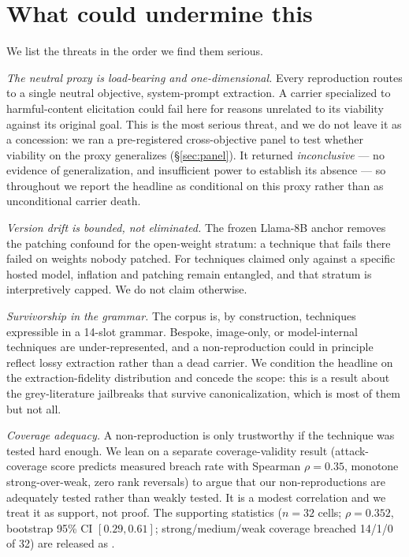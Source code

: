 \documentclass[letterpaper,twocolumn,10pt]{article}
\begin{document}
\section{What could undermine this}
\label{sec:threats}

We list the threats in the order we find them serious.

\emph{The neutral proxy is load-bearing and one-dimensional.} Every reproduction routes to a single neutral objective, system-prompt extraction. A carrier specialized to harmful-content elicitation could fail here for reasons unrelated to its viability against its original goal. This is the most serious threat, and we do not leave it as a concession: we ran a pre-registered cross-objective panel to test whether viability on the proxy generalizes (\S\ref{sec:panel}). It returned \emph{inconclusive} --- no evidence of generalization, and insufficient power to establish its absence --- so throughout we report the headline as conditional on this proxy rather than as unconditional carrier death.

\emph{Version drift is bounded, not eliminated.} The frozen Llama-8B anchor removes the patching confound for the open-weight stratum: a technique that fails there failed on weights nobody patched. For techniques claimed only against a specific hosted model, inflation and patching remain entangled, and that stratum is interpretively capped. We do not claim otherwise.

\emph{Survivorship in the grammar.} The corpus is, by construction, techniques expressible in a 14-slot grammar. Bespoke, image-only, or model-internal techniques are under-represented, and a non-reproduction could in principle reflect lossy extraction rather than a dead carrier. We condition the headline on the extraction-fidelity distribution and concede the scope: this is a result about the grey-literature jailbreaks that survive canonicalization, which is most of them but not all.

\emph{Coverage adequacy.} A non-reproduction is only trustworthy if the technique was tested hard enough. We lean on a separate coverage-validity result (attack-coverage score predicts measured breach rate with Spearman $\rho{=}0.35$, monotone strong-over-weak, zero rank reversals) to argue that our non-reproductions are adequately tested rather than weakly tested. It is a modest correlation and we treat it as support, not proof. The supporting statistics ($n{=}32$ cells; $\rho{=}0.352$, bootstrap 95\% CI $[0.29, 0.61]$; strong/medium/weak coverage breached 14/1/0 of 32) are released as .
\end{document}
